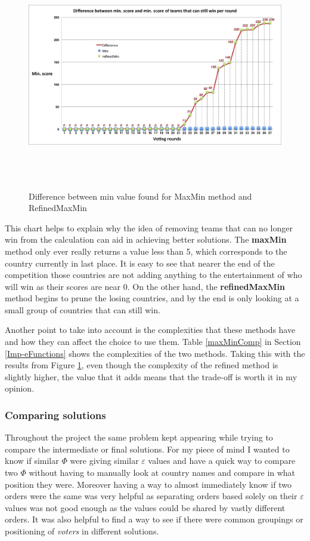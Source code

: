 \documentclass[12pt]{report}
\begin{document}
\begin{figure}[H]
\centering
\includegraphics[width=18cm, height=10cm]{../code/misc/difference_MinvsRefinedMin}
\caption{Difference between min value found for MaxMin method and RefinedMaxMin}
\label{f_maxminDif}
\end{figure}

This chart helps to explain why the idea of removing teams that can no longer win from the calculation can aid in achieving better solutions. The \textbf{maxMin} method only ever really returns a value less than 5, which corresponds to the country currently in last place. It is easy to see that nearer the end of the competition those countries are not adding anything to the entertainment of who will win as their scores are near 0. On the other hand, the \textbf{refinedMaxMin} method begins to prune the losing countries, and by the end is only looking at a small group of countries that can still win.

Another point to take into account is the complexities that these methods have and how they can affect the choice to use them. Table \ref{maxMinComp} in Section \ref{Imp-eFunctions} shows the complexities of the two methods. Taking this with the results from Figure \ref{f_maxminDif}, even though the complexity of the refined method is slightly higher, the value that it adds means that the trade-off is worth it in my opinion.

\subsubsection{Comparing solutions}
Throughout the project the same problem kept appearing while trying to compare the intermediate or final solutions. For my piece of mind I wanted to know if similar $\Phi$ were giving similar $\varepsilon$ values and have a quick way to compare two $\Phi$ without having to manually look at country names and compare in what position they were. Moreover having a way to almost immediately know if two orders were the same was very helpful as separating orders based solely on their $\varepsilon$ values was not good enough as the values could be shared by vastly different orders. It was also helpful to find a way to see if there were common groupings or positioning of \textit{voters} in different solutions.
\end{document}
